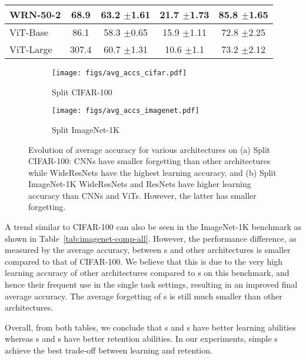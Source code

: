 \begin{center}
\begin{minipage}{0.472\textwidth}
\begin{table}[H]
{\begin{tabular}{@{}lcccc@{}}
WRN-50-2 & 68.9 & 63.2 $\pm$1.61 & 21.7 $\pm$1.73 & 85.8 $\pm$1.65 \\\midrule
ViT-Base & 86.1 & 58.3 $\pm$0.65 & 15.9 $\pm$1.11 & 72.8 $\pm$2.25 \\ 
ViT-Large & 307.4 & 60.7 $\pm$1.31 & 10.6 $\pm$1.1 & 73.2 $\pm$2.12 \\ \bottomrule
\end{tabular}%
}
\end{table}
\vspace{17mm}
\end{minipage}
\end{center}


\begin{figure*}[ht]
\centering
\begin{subfigure}{.47\textwidth}
      \centering
      \texttt{[image: figs/avg\_accs\_cifar.pdf]}
      \caption{Split CIFAR-100}
      \label{fig:evolution-accs-cifar}
\end{subfigure}\hfill
\begin{subfigure}{.47\textwidth}
      \centering
      \texttt{[image: figs/avg\_accs\_imagenet.pdf]}
      \caption{Split ImageNet-1K}
      \label{fig:evolution-accs-imagenet}
\end{subfigure}
\caption{Evolution of average accuracy for various architectures on (a) Split CIFAR-100: CNNs have smaller forgetting than other architectures while WideResNets have the highest learning accuracy, and (b) Split ImageNet-1K WideResNets and ResNets have higher learning accuracy than CNNs and ViTs. However, the latter has smaller forgetting.}
\end{figure*}

A trend similar to CIFAR-100 can also be seen in the ImageNet-1K benchmark as shown in Table~\ref{tab:imagenet-comp-all}. However, the performance difference, as measured by the average accuracy, between \CNN s and other architectures is smaller compared to that of CIFAR-100. We believe that this is due to the very high learning accuracy of other architectures compared to \CNN s on this benchmark, and hence their frequent use in the single task settings, resulting in an improved final average accuracy. The average forgetting of \CNN s is still much smaller than other architectures. 

Overall, from both tables, we conclude that \ResNet s and \WRN s have better learning abilities whereas \CNN s and \ViT s have better retention abilities. In our experiments, simple \CNN s achieve the best trade-off between learning and retention.